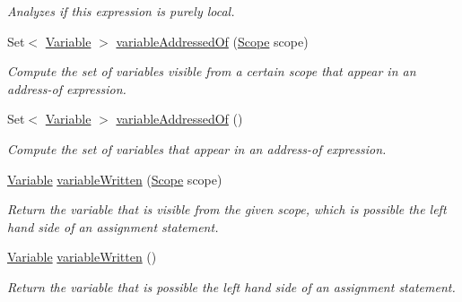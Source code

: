 \begin{DoxyCompactItemize}
\begin{DoxyCompactList}\small\item\em Analyzes if this expression is purely local. \end{DoxyCompactList}\item 
Set$<$ \hyperlink{interfaceedu_1_1udel_1_1cis_1_1vsl_1_1civl_1_1model_1_1IF_1_1variable_1_1Variable}{Variable} $>$ \hyperlink{classedu_1_1udel_1_1cis_1_1vsl_1_1civl_1_1model_1_1common_1_1expression_1_1CommonVariableExpression_a9fa669511697c5883063fb6464173a7a}{variable\+Addressed\+Of} (\hyperlink{interfaceedu_1_1udel_1_1cis_1_1vsl_1_1civl_1_1model_1_1IF_1_1Scope}{Scope} scope)
\begin{DoxyCompactList}\small\item\em Compute the set of variables visible from a certain scope that appear in an address-\/of expression. \end{DoxyCompactList}\item 
Set$<$ \hyperlink{interfaceedu_1_1udel_1_1cis_1_1vsl_1_1civl_1_1model_1_1IF_1_1variable_1_1Variable}{Variable} $>$ \hyperlink{classedu_1_1udel_1_1cis_1_1vsl_1_1civl_1_1model_1_1common_1_1expression_1_1CommonVariableExpression_afdce12c4a01c50af9027fd5f987c913a}{variable\+Addressed\+Of} ()
\begin{DoxyCompactList}\small\item\em Compute the set of variables that appear in an address-\/of expression. \end{DoxyCompactList}\item 
\hyperlink{interfaceedu_1_1udel_1_1cis_1_1vsl_1_1civl_1_1model_1_1IF_1_1variable_1_1Variable}{Variable} \hyperlink{classedu_1_1udel_1_1cis_1_1vsl_1_1civl_1_1model_1_1common_1_1expression_1_1CommonVariableExpression_a82f9554c7fae0c4870ade14b20998b87}{variable\+Written} (\hyperlink{interfaceedu_1_1udel_1_1cis_1_1vsl_1_1civl_1_1model_1_1IF_1_1Scope}{Scope} scope)
\begin{DoxyCompactList}\small\item\em Return the variable that is visible from the given scope, which is possible the left hand side of an assignment statement. \end{DoxyCompactList}\item 
\hyperlink{interfaceedu_1_1udel_1_1cis_1_1vsl_1_1civl_1_1model_1_1IF_1_1variable_1_1Variable}{Variable} \hyperlink{classedu_1_1udel_1_1cis_1_1vsl_1_1civl_1_1model_1_1common_1_1expression_1_1CommonVariableExpression_a550b44a0bf02e6bcb71a4679223d6282}{variable\+Written} ()
\begin{DoxyCompactList}\small\item\em Return the variable that is possible the left hand side of an assignment statement. \end{DoxyCompactList}\item 

\end{DoxyCompactItemize}
